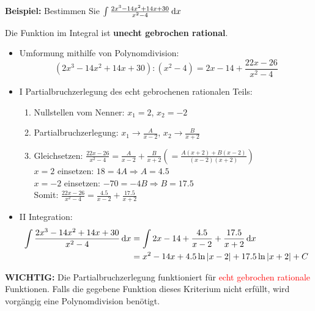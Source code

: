 \textbf{Beispiel:}
Bestimmen Sie $\int \frac{2x^3 - 14x^2 + 14x + 30}{x^2 - 4} \,\mathrm{d}x$

Die Funktion im Integral ist \textbf{unecht gebrochen rational}.

\begin{itemize}
    \item Umformung mithilfe von Polynomdivision: \[(2x^3 - 14x^2 + 14x + 30) : (x^2 - 4) = 2x - 14 + \frac{22x - 26}{x^2 - 4}\]
    \item I Partialbruchzerlegung des echt gebrochenen rationalen Teils:
    \begin{enumerate}
        \item Nullstellen vom Nenner: $x_1 = 2$, $x_2 = -2$
        \item Partialbruchzerlegung: $x_1 \rightarrow \frac{A}{x-2}$, $x_2 \rightarrow \frac{B}{x+2}$
        \item Gleichsetzen: $\frac{22x - 26}{x^2 -4} = \frac{A}{x - 2} + \frac{B}{x + 2} \left( = \frac{A(x + 2) + B(x - 2)}{(x-2)(x+2)} \right)$ \\ $x = 2$ einsetzen: $18 = 4A \Rightarrow A = 4.5$ \\ $x = -2$ einsetzen: $-70 = -4B \Rightarrow B = 17.5$ \\ Somit: $\frac{22x - 26}{x^2 - 4} = \frac{4.5}{x - 2} + \frac{17.5}{x + 2}$
    \end{enumerate}
    \item II Integration:
    \begin{align*}
        \int \frac{2x^3 - 14x^2 + 14x + 30}{x^2 - 4}\,\mathrm{d}x &= \int 2x - 14 + \frac{4.5}{x - 2} + \frac{17.5}{x + 2} \,\mathrm{d}x \\
        &= x^2 - 14x + 4.5 \ln |x - 2| + 17.5 \ln |x + 2| + C
    \end{align*}
\end{itemize}

\textbf{WICHTIG:} Die Partialbruchzerlegung funktioniert für \textcolor{red}{echt gebrochen rationale} Funktionen.
Falls die gegebene Funktion dieses Kriterium nicht erfüllt, wird vorgängig eine Polynomdivision benötigt.